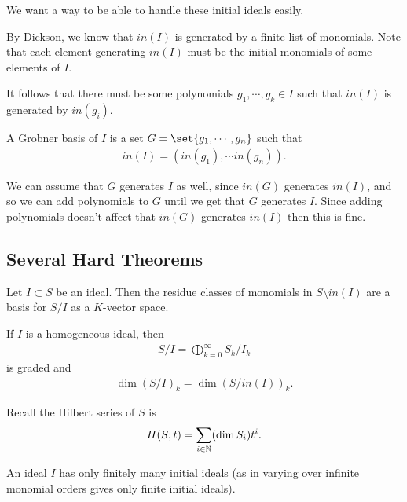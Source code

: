 We want a way to be able to handle these initial ideals easily.

By Dickson, we know that $in(I)$ is generated by a finite list of monomials. Note that each element generating $in(I)$ must be the initial monomials of some elements of $I$.

It follows that there must be some polynomials $g_1, \cdots, g_k \in I$ such that $in(I)$ is generated by $in(g_i)$.

\begin{definition}
A Grobner basis of $I$ is a set $G = \set{g_1, \cdots, g_n}$ such that
\begin{align*}
    in(I) = ( in(g_1) , \cdots in(g_n) ).
\end{align*}
\end{definition}

We can assume that $G $ generates $I$ as well, since $in(G)$ generates $in(I)$, and so we can add polynomials to $G$ until we get that $G$ generates $I$. Since adding polynomials doesn't affect that $in(G)$ generates $in(I)$ then this is fine.

\subsection{Several Hard Theorems}

\begin{theorem}
Let $I \subset S$ be an ideal. Then the residue classes of monomials in $S \setminus in(I)$ are a basis for $S / I$ as a $K$-vector space.
\end{theorem}

\begin{corollary}
If $I$ is a homogeneous ideal, then
\begin{align*}
    S/I = \bigoplus_{k=0}^\infty S_k / I_k
\end{align*} is graded and
\begin{align*}
    \dim( S/I)_k = \dim (S/ in(I) )_k.
\end{align*}
\end{corollary}

Recall the Hilbert series of $S$ is
\begin{align*}
    H(S ; t) = \sum_{i \in \mathbb{N}} (\dim S_i) t^i.
\end{align*}

\begin{theorem}
An ideal $I$ has only finitely many initial ideals (as in varying over infinite monomial orders gives only finite initial ideals). 
\end{theorem}

